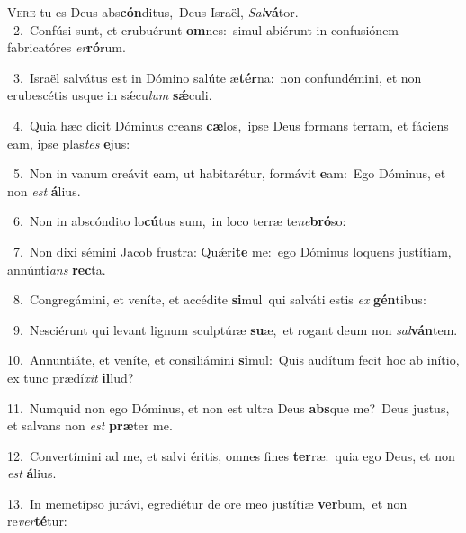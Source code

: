 \lettrine{\initial\textcolor{\initialcolor}{V}}{ere} tu es Deus abs\-\textbf{cón}\-ditus,~\star Deus Israël, \textit{Sal}\-\textbf{vá}tor.\\
{\numbfont\textcolor{\numbcolor}{~2.}}~Confúsi sunt, et erubuérunt \textbf{om}\-nes:~\star simul abiérunt in confusiónem fabricatóres \textit{er}\-\textbf{ró}rum.\par
{\numbfont\textcolor{\numbcolor}{~3.}}~Israël salvátus est in Dómino salúte æ\-\textbf{tér}\-na:~\star non confundémini, et non erubescétis usque in sǽcu\textit{lum} \textbf{sǽ}\-culi.\par
{\numbfont\textcolor{\numbcolor}{~4.}}~Quia hæc dicit Dóminus creans \textbf{cæ}\-los,~\star ipse Deus formans terram, et fáciens eam, ipse plas\textit{tes} \textbf{e}\-jus:\par
{\numbfont\textcolor{\numbcolor}{~5.}}~Non in vanum creávit eam, ut habitarétur, formávit \textbf{e}\-am:~\star Ego Dóminus, et non \textit{est} \textbf{á}\-lius.\par
{\numbfont\textcolor{\numbcolor}{~6.}}~Non in abscóndito lo\-\textbf{cú}\-tus sum,~\star in loco terræ te\-\textit{ne}\-\textbf{bró}so:\par
{\numbfont\textcolor{\numbcolor}{~7.}}~Non dixi sémini Jacob frustra: Quǽri\textbf{te} me:~\star ego Dóminus loquens justítiam, annúnti\textit{ans} \textbf{rec}\-ta.\par
{\numbfont\textcolor{\numbcolor}{~8.}}~Congregámini, et veníte, et accédite \textbf{si}\-mul~\star qui salváti estis \textit{ex} \textbf{gén}\-tibus:\par
{\numbfont\textcolor{\numbcolor}{~9.}}~Nesciérunt qui levant lignum sculptúræ \textbf{su}\-æ,~\star et rogant deum non \textit{sal}\-\textbf{ván}tem.\par
{\numbfont\textcolor{\numbcolor}{10.}}~Annuntiáte, et veníte, et consiliámini \textbf{si}\-mul:~\star Quis audítum fecit hoc ab inítio, ex tunc prædí\textit{xit} \textbf{il}\-lud?\par
{\numbfont\textcolor{\numbcolor}{11.}}~Numquid non ego Dóminus, et non est ultra Deus \textbf{abs}\-que me?~\star Deus justus, et salvans non \textit{est} \textbf{præ}\-ter me.\par
{\numbfont\textcolor{\numbcolor}{12.}}~Convertímini ad me, et salvi éritis, omnes fines \textbf{ter}\-ræ:~\star quia ego Deus, et non \textit{est} \textbf{á}\-lius.\par
{\numbfont\textcolor{\numbcolor}{13.}}~In memetípso jurávi, egrediétur de ore meo justítiæ \textbf{ver}\-bum,~\star et non re\-\textit{ver}\-\textbf{té}tur:\par
